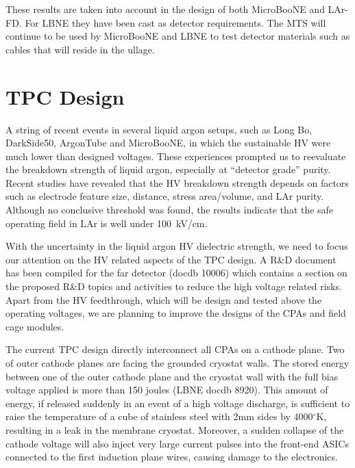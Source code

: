 These results are taken into account in the design of both MicroBooNE and LAr-FD. For LBNE they have been cast as detector requirements. The MTS will continue to be used by MicroBooNE and LBNE to test detector materials such as cables that will reside in the ullage.


\section{TPC Design}

A string of recent events in several liquid argon setups, such as Long Bo, DarkSide50, ArgonTube and MicroBooNE, in which the sustainable HV were much lower  than designed voltages. These experiences prompted us to reevaluate the breakdown strength of liquid argon, especially at ``detector grade'' purity. Recent studies \cite{bib:HV_in_LAr_1}\cite{bib:HV_in_LAr_2} have revealed that the HV breakdown strength depends on factors such as electrode feature size, distance, stress area/volume, and LAr purity. Although no conclusive threshold was found, the results indicate that the safe operating field in LAr is well under 100~kV/cm.
 
With the uncertainty in the liquid argon HV dielectric strength, we need to focus our attention on the HV related aspects of the TPC design. A R\&D document has been compiled for the far detector (docdb 10006) which contains a section on the proposed R\&D topics and activities to reduce the high voltage related risks. Apart from the HV feedthrough, which will be design and tested above the operating voltages, we are planning to improve the designs of the CPAs and field cage modules.
 
The current TPC design directly interconnect all CPAs on a cathode plane. Two of outer cathode planes are facing the grounded cryostat walls. The stored energy between one of the outer cathode plane and the cryostat wall with the full bias voltage applied is more than 150 joules (LBNE docdb 8920). This amount of energy, if released suddenly in an event of a high voltage discharge, is sufficient to raise the temperature of a cube of stainless steel with 2mm sides by 4000$^\circ$K, resulting in a leak in the membrane cryostat. Moreover, a sudden collapse of the cathode voltage will also inject very large current pulses into the front-end ASICs connected to the first induction plane wires, causing damage to the electronics.
 

